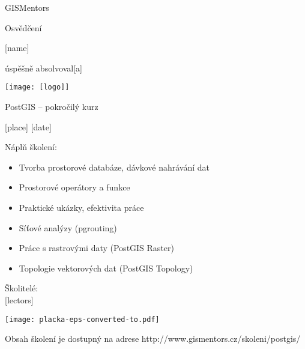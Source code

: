 \documentclass[12pt, a4paper]{letter}
\begin{document}
\pagestyle{empty}
\begin{center}

{\Large GISMentors}

{\Huge Osvědčení}

{\Large [name]}

úspěšně absolvoval[a]

\texttt{[image: [logo]]}

{\Large PostGIS -- pokročilý kurz}

[place] [date]
\end{center}

Náplň školení:

\begin{itemize}
\item Tvorba prostorové databáze, dávkové nahrávání dat
\item Prostorové operátory a funkce
\item Praktické ukázky, efektivita práce
\item Síťové analýzy (pgrouting)
\item Práce s rastrovými daty (PostGIS Raster)
\item Topologie vektorových dat (PostGIS Topology)
\end{itemize}

\vfill
\parbox{7cm}{

    Školitelé: \\

    [lectors]
}
\hfill
\parbox{3cm}{
        \texttt{[image: placka-eps-converted-to.pdf]}
}


\begin{center}
{\footnotesize Obsah školení je dostupný na adrese
http://www.gismentors.cz/skoleni/postgis/}
\end{center}
\end{document}
